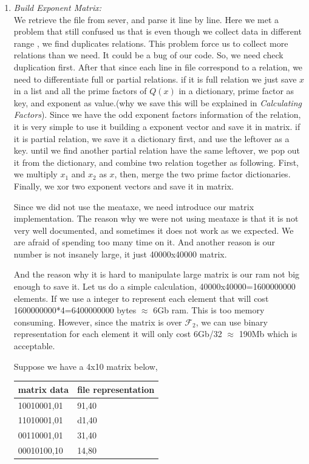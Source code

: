\documentclass[12pt]{article} %
\newcommand{\itemgap}[1][2]{\vspace{#1mm}}
\begin{document}
\begin{enumerate}
		\item \textit{Build Exponent Matrix:} \itemgap
		\\ We retrieve the file from sever, and parse it line by line. Here we met a problem that still confused us that is even though we collect data in different range , we find duplicates relations. This problem force us to collect more relations than we need. It could be a bug of our code. So, we need check duplication first.
		After that since each line in file correspond to a relation, we need to differentiate full or partial relations. if it is full relation we just save $x$ in a list and all the prime factors of $Q(x)$ in a dictionary, prime factor as key, and exponent as value.(why we save this will be explained in \textit{Calculating Factors}). Since we have the odd exponent factors information of the relation, it is very simple to use it building a exponent vector and save it in matrix. if it is partial relation, we save it a dictionary first, and use the leftover as a key. until we find another partial relation have the same leftover, we pop out it from the dictionary, and combine two relation together as following. First, we multiply $x_1$ and $x_2$ as $x$, then, merge the two prime factor dictionaries. Finally, we xor two exponent vectors and save it in matrix.
		
		Since we did not use the meataxe, we need introduce our matrix implementation. The reason why we were not using meataxe is that it is not very well documented, and sometimes it does not work as we expected. We are afraid of spending too many time on it. And another reason is our number is not insanely large, it just 40000x40000 matrix. 
		
		And the reason why it is hard to manipulate large matrix is our ram not big enough to save it. Let us do a simple calculation, 40000x40000=1600000000 elements. If we use a integer to represent each element that will cost 1600000000*4=6400000000 bytes $\approx$ 6Gb ram. This is too memory consuming. However, since the matrix is over $\mathcal{F}_2$, we can use binary representation for each element it will only cost 6Gb/32 $\approx$ 190Mb which is acceptable. 
		
		Suppose we have a 4x10 matrix below, 
		\begin{table}[h]
			\centering
			\begin{tabular}{|l|l|}
				\hline
				matrix data & file representation \\
				\hline
				10010001,01 & 91,40 \\
				\hline
				11010001,01 & d1,40 \\
				\hline
				00110001,01 & 31,40 \\
				\hline
				00010100,10 & 14,80 \\
				\hline
			\end{tabular}
		\end{table}
		

\end{enumerate}
\end{document}
